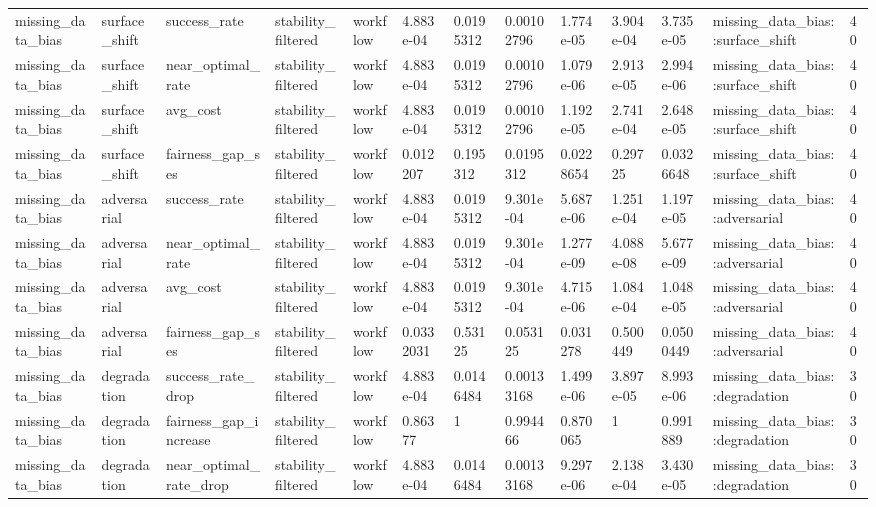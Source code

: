 \begin{tabular}{lllllllllllll}
missing\_data\_bias & surface\_shift & success\_rate & stability\_filtered & workflow & 4.883e-04 & 0.0195312 & 0.00102796 & 1.774e-05 & 3.904e-04 & 3.735e-05 & missing\_data\_bias::surface\_shift & 40 \\
missing\_data\_bias & surface\_shift & near\_optimal\_rate & stability\_filtered & workflow & 4.883e-04 & 0.0195312 & 0.00102796 & 1.079e-06 & 2.913e-05 & 2.994e-06 & missing\_data\_bias::surface\_shift & 40 \\
missing\_data\_bias & surface\_shift & avg\_cost & stability\_filtered & workflow & 4.883e-04 & 0.0195312 & 0.00102796 & 1.192e-05 & 2.741e-04 & 2.648e-05 & missing\_data\_bias::surface\_shift & 40 \\
missing\_data\_bias & surface\_shift & fairness\_gap\_ses & stability\_filtered & workflow & 0.012207 & 0.195312 & 0.0195312 & 0.0228654 & 0.29725 & 0.0326648 & missing\_data\_bias::surface\_shift & 40 \\
missing\_data\_bias & adversarial & success\_rate & stability\_filtered & workflow & 4.883e-04 & 0.0195312 & 9.301e-04 & 5.687e-06 & 1.251e-04 & 1.197e-05 & missing\_data\_bias::adversarial & 40 \\
missing\_data\_bias & adversarial & near\_optimal\_rate & stability\_filtered & workflow & 4.883e-04 & 0.0195312 & 9.301e-04 & 1.277e-09 & 4.088e-08 & 5.677e-09 & missing\_data\_bias::adversarial & 40 \\
missing\_data\_bias & adversarial & avg\_cost & stability\_filtered & workflow & 4.883e-04 & 0.0195312 & 9.301e-04 & 4.715e-06 & 1.084e-04 & 1.048e-05 & missing\_data\_bias::adversarial & 40 \\
missing\_data\_bias & adversarial & fairness\_gap\_ses & stability\_filtered & workflow & 0.0332031 & 0.53125 & 0.053125 & 0.031278 & 0.500449 & 0.0500449 & missing\_data\_bias::adversarial & 40 \\
missing\_data\_bias & degradation & success\_rate\_drop & stability\_filtered & workflow & 4.883e-04 & 0.0146484 & 0.00133168 & 1.499e-06 & 3.897e-05 & 8.993e-06 & missing\_data\_bias::degradation & 30 \\
missing\_data\_bias & degradation & fairness\_gap\_increase & stability\_filtered & workflow & 0.86377 & 1 & 0.994466 & 0.870065 & 1 & 0.991889 & missing\_data\_bias::degradation & 30 \\
missing\_data\_bias & degradation & near\_optimal\_rate\_drop & stability\_filtered & workflow & 4.883e-04 & 0.0146484 & 0.00133168 & 9.297e-06 & 2.138e-04 & 3.430e-05 & missing\_data\_bias::degradation & 30 \\

\end{tabular}
